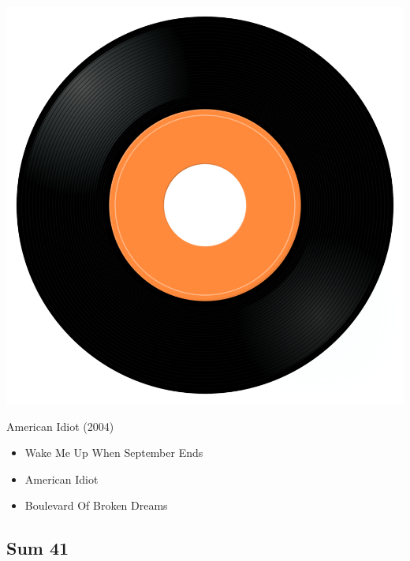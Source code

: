 \begin{minipage}[t]{0.25\textwidth}
\captionsetup{type=figure}
\includegraphics[width=\textwidth]{Images/cover.png}
\caption*{American Idiot (2004)}
\end{minipage}
\begin{minipage}[t]{0.25\textwidth}\vspace{0pt}
\begin{itemize}[nosep,leftmargin=1em,labelwidth=*,align=left]
	\setlength{\itemsep}{0pt}
	\item Wake Me Up When September Ends
	\item American Idiot
	\item Boulevard Of Broken Dreams
\end{itemize}
\end{minipage}

\subsection{Sum 41}

